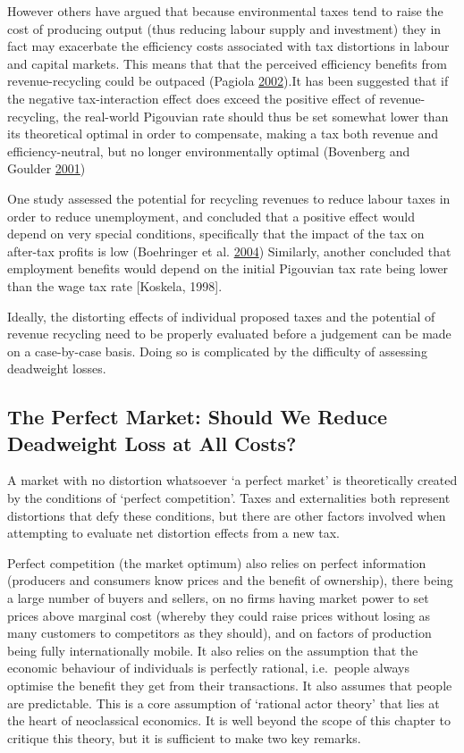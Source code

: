 \documentclass[]{tufte-handout}
\begin{document}
However others have argued that because environmental taxes tend to
raise the cost of producing output (thus reducing labour supply and
investment) they in fact may exacerbate the efficiency costs associated
with tax distortions in labour and capital markets. This means that that
the perceived efficiency benefits from revenue-recycling could be
outpaced (Pagiola \protect\hyperlink{ref-Pagiola2002}{2002}).It has been
suggested that if the negative tax-interaction effect does exceed the
positive effect of revenue-recycling, the real-world Pigouvian rate
should thus be set somewhat lower than its theoretical optimal in order
to compensate, making a tax both revenue and efficiency-neutral, but no
longer environmentally optimal (Bovenberg and Goulder
\protect\hyperlink{ref-Bovenberg2001}{2001})

One study assessed the potential for recycling revenues to reduce labour
taxes in order to reduce unemployment, and concluded that a positive
effect would depend on very special conditions, specifically that the
impact of the tax on after-tax profits is low (Boehringer et al.
\protect\hyperlink{ref-Boehringer2004}{2004}) Similarly, another
concluded that employment benefits would depend on the initial Pigouvian
tax rate being lower than the wage tax rate {[}Koskela, 1998{]}.

Ideally, the distorting effects of individual proposed taxes and the
potential of revenue recycling need to be properly evaluated before a
judgement can be made on a case-by-case basis. Doing so is complicated
by the difficulty of assessing deadweight losses.

\hypertarget{the-perfect-market-should-we-reduce-deadweight-loss-at-all-costs}{%
\subsection{The Perfect Market: Should We Reduce Deadweight Loss at All
Costs?}\label{the-perfect-market-should-we-reduce-deadweight-loss-at-all-costs}}

A market with no distortion whatsoever `a perfect market' is
theoretically created by the conditions of `perfect competition'. Taxes
and externalities both represent distortions that defy these conditions,
but there are other factors involved when attempting to evaluate net
distortion effects from a new tax.

Perfect competition (the market optimum) also relies on perfect
information (producers and consumers know prices and the benefit of
ownership), there being a large number of buyers and sellers, on no
firms having market power to set prices above marginal cost (whereby
they could raise prices without losing as many customers to competitors
as they should), and on factors of production being fully
internationally mobile. It also relies on the assumption that the
economic behaviour of individuals is perfectly rational, i.e.~people
always optimise the benefit they get from their transactions. It also
assumes that people are predictable. This is a core assumption of
`rational actor theory' that lies at the heart of neoclassical
economics. It is well beyond the scope of this chapter to critique this
theory, but it is sufficient to make two key remarks.
\end{document}
